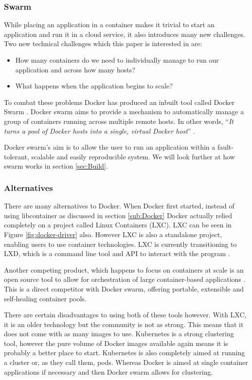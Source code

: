 \documentclass{article}
\begin{document}
\subsubsection{Swarm}
\label{subs:Swarm}
While placing an application in a container makes it trivial to start an application and run it in a cloud service, it also introduces many new challenges. Two new technical challenges which this paper is interested in are:
\begin{itemize}
  \item How many containers do we need to individually manage to run our application and across how many hosts? 
  \item What happens when the application begins to scale? 
\end{itemize}

To combat these problems Docker has produced an inbuilt tool called Docker Swarm \citep{Swarm2016}. Docker swarm aims to provide a mechanism to automatically manage a group of containers running across multiple remote hosts. In other words, ``\textit{It turns a pool of Docker hosts into a single, virtual Docker host}'' \citep{Swarm2016}.

Docker swarm's aim is to allow the user to run an application within a fault-tolerant, scalable and easily reproducible system. We will look further at how swarm works in section \ref{sec:Build}.

\subsubsection{Alternatives}
\label{subs:Docker-alt}
There are many alternatives to Docker. When Docker first started, instead of using libcontainer as discussed in section \ref{sub:Docker} Docker actually relied completely on a project called Linux Containers (LXC). LXC can be seen in Figure \ref{fig:docker-driver} also. However LXC is also a standalone project, enabling users to use container technologies. LXC is currently transitioning to LXD, which is a command line tool and API to interact with the program \citep{LXC2016}. 

Another competing product, which happens to focus on containers at scale is an open source tool to allow for orchestration of large container-based applications \citep{Kubernetes2016}. This is a direct competitor with Docker swarm, offering portable, extensible and self-healing container pools.

There are certain disadvantages to using both of these tools however. With LXC, it is an older technology but the community is not as strong. This means that it does not come with as many images to use. Kubernetes is a strong clustering tool, however the pure volume of Docker images available again means it is probably a better place to start. Kubernetes is also completely aimed at running a cluster or, as they call them, pods. Whereas Docker is aimed at single container applications if necessary and then Docker swarm allows for clustering. 
\end{document}
